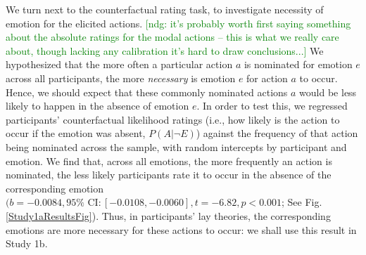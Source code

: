 \documentclass[10pt,letterpaper]{article}
\newcommand{\ndg}[1]{\textcolor{Green}{[ndg: #1]}}
\begin{document}
\begin{table}
\caption{ Action nominations from emotions (Study 1a). Top 5 responses for each emotion, with nomination counts in parentheses. The most common responses for anger were variants of ``hit X", where X is an object or person (of these, the modal response was: ``punched the wall"). }
\label{Study1aResultsTable}
\end{table}



We turn next to the counterfactual rating task, to investigate necessity of emotion for the elicited actions. 
\ndg{it's probably worth first saying something about the absolute ratings for the modal actions -- this is what we really care about, though lacking any calibration it's hard to draw conclusions...}
We hypothesized that the more often a particular action $a$ is nominated for emotion $e$ across all participants, the more \textit{necessary} is emotion $e$ for action $a$ to occur. Hence, we should expect that these commonly nominated actions $a$ would be less likely to happen in the absence of emotion $e$. In order to test this, we regressed participants' counterfactual likelihood ratings (i.e., how likely is the action to occur if the emotion was absent, $P(A | \neg E)$) against the frequency of that action being nominated across the sample, with random intercepts by participant and emotion. 
We find that, across all emotions, the more frequently an action is nominated, the less likely participants rate it to occur in the absence of the corresponding emotion $(b = -0.0084, 95\% \text{ CI}: [-0.0108, -0.0060], t=-6.82, p<0.001$; See Fig. \ref{Study1aResultsFig}). 
Thus, in participants' lay theories, the corresponding emotions are more necessary for these actions to occur: we shall use this result in Study 1b.
\end{document}
